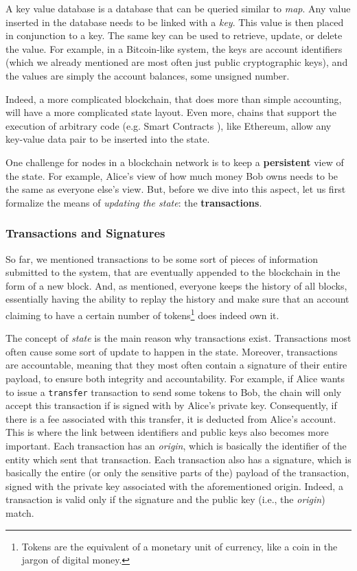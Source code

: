 A key value database is a database that can be queried similar to \textit{map}. Any value inserted in the database
needs to be linked with a \textit{key}. This value is then placed in conjunction to a key. The same
key can be used to retrieve, update, or delete the value. For example, in a Bitcoin-like system, the
keys are account identifiers (which we already mentioned are most often just public cryptographic
keys), and the values are simply the account balances, some unsigned number.

Indeed, a more complicated blockchain, that does more than simple accounting, will have a more
complicated state layout. Even more, chains that support the execution of arbitrary code (e.g. Smart
Contracts \cite{EthereumWiki}), like Ethereum, allow any key-value data pair to be inserted into the
state.

One challenge for nodes in a blockchain network is to keep a \textbf{persistent} view of the
state. For example, Alice's view of how much money Bob owns needs to be the same as everyone else's
view. But, before we dive into this aspect, let us first formalize the means of \textit{updating the
state}: the \textbf{transactions}.

\subsubsection{Transactions and Signatures} \label{chap_bg:subsec:transaction_sig}

So far, we mentioned transactions to be some sort of pieces of information submitted to the system, that
are eventually appended to the blockchain in the form of a new block. And, as mentioned, everyone
keeps the history of all blocks, essentially having the ability to replay the history and make sure
that an account claiming to have a certain number of tokens\footnote{Tokens are the equivalent of a monetary unit of
currency, like a coin in the jargon of digital money.} does indeed own it.

The concept of \textit{state} is the main
reason why transactions exist. Transactions most often cause some sort of update to happen in the
state. Moreover, transactions are accountable, meaning that they most often contain a signature of
their entire payload, to ensure both integrity and accountability. For example, if Alice wants to
issue a \texttt{transfer} transaction to send some tokens to Bob, the chain will only accept this
transaction if is signed with by Alice's private key. Consequently, if there is a fee associated
with this transfer, it is deducted from Alice's account. This is where the link between identifiers
and public keys also becomes more important. Each transaction has an \textit{origin}, which is
basically the identifier of the entity which sent that transaction. Each transaction also has a
signature, which is basically the entire (or only the sensitive parts of the) payload of the
transaction, signed with the private key associated with the aforementioned origin. Indeed, a
transaction is valid only if the signature and the public key (i.e., the \textit{origin}) match.

